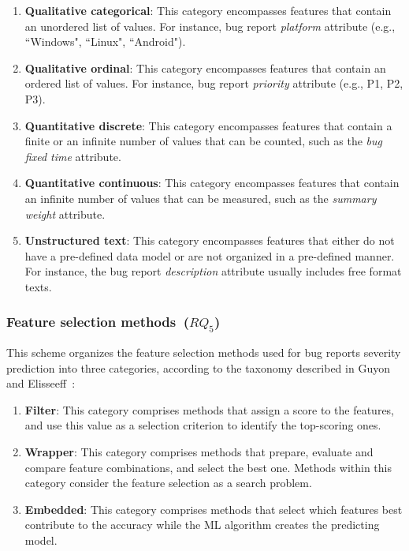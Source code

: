 \begin{enumerate}[label=\alph*., leftmargin=1.2cm]
  \item \textbf{Qualitative categorical}: This category encompasses features that contain an unordered list of values. For instance, 
  bug report \textit{platform} attribute (e.g., ``Windows", ``Linux", ``Android"). 
  \item \textbf{Qualitative ordinal}: This category encompasses features that contain an ordered list of values. For instance, bug report \textit{priority} attribute (e.g., P1, P2, P3). 
  \item \textbf{Quantitative discrete}: This category encompasses features that contain a finite or an infinite number of values that can be counted, such as the \textit{bug fixed time} attribute. 
  \item \textbf{Quantitative continuous}: This category encompasses features that contain an infinite number of values that can be measured, such as the \textit{summary weight} attribute.
  \item \textbf{Unstructured text}: This category encompasses features that either do not have a pre-defined data model or are not organized in a pre-defined manner. For instance, the bug report \textit{description} attribute usually includes free format texts.
\end{enumerate}

\subsubsection{Feature selection methods~($RQ_5$)}
This scheme organizes the feature selection methods used for bug reports severity prediction into three categories, according to the taxonomy described in Guyon and Elisseeff~\cite{Guyon:2003}:

\begin{enumerate}[label=\alph*., leftmargin=1.2cm]
  \item \textbf{Filter}: This category comprises methods that assign a score to the features, and use this value as a selection criterion to identify the top-scoring ones.
  \item \textbf{Wrapper}: This category comprises methods that prepare, evaluate and compare feature combinations, and select the best one. Methods within this category consider the feature selection as a search problem.
  \item \textbf{Embedded}: This category comprises methods that select which features best contribute to the accuracy while the ML algorithm creates the predicting model.
\end{enumerate}

